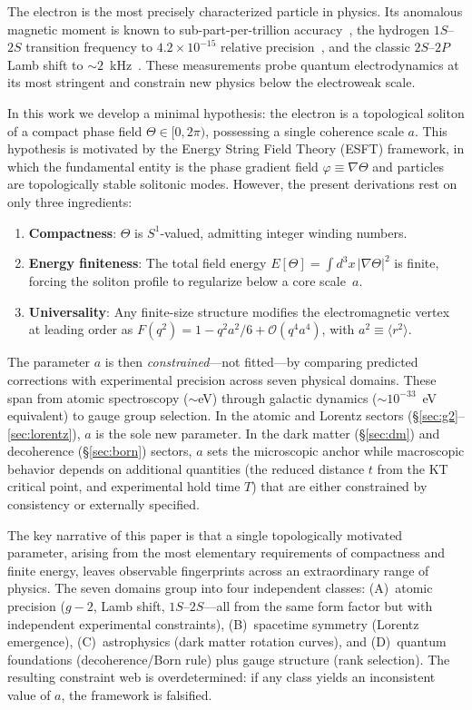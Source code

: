 ﻿\documentclass[a4paper,12pt]{article}
\newcommand{\vev}[1]{\langle #1 \rangle}
\newcommand{\order}[1]{\mathcal{O}(#1)}
\begin{document}
The electron is the most precisely characterized particle in physics.
Its anomalous magnetic moment is known to sub-part-per-trillion
accuracy~\cite{Fan2023,Morel2020}, the hydrogen $1S$--$2S$ transition
frequency to $4.2\times 10^{-15}$ relative precision~\cite{Parthey2011},
and the classic $2S$--$2P$ Lamb shift to $\sim 2$~kHz~\cite{Bezginov2019}.
These measurements probe quantum electrodynamics at its most stringent
and constrain new physics below the electroweak scale.

In this work we develop a minimal hypothesis: the electron is a
topological soliton of a compact phase field $\Theta\in[0,2\pi)$,
possessing a single coherence scale $a$.  This hypothesis is motivated
by the Energy String Field Theory (ESFT) framework, in
which the fundamental entity is the phase gradient field
$\varphi\equiv\nabla\Theta$ and particles are topologically stable
solitonic modes.  However, the present derivations rest on only three
ingredients:
\begin{enumerate}
  \item \textbf{Compactness}: $\Theta$ is $S^1$-valued, admitting
    integer winding numbers.
  \item \textbf{Energy finiteness}: The total field energy
    $E[\Theta]=\int d^3x\,|\nabla\Theta|^2$ is finite, forcing
    the soliton profile to regularize below a core scale~$a$.
  \item \textbf{Universality}: Any finite-size structure modifies the
    electromagnetic vertex at leading order as
    $F(q^2)=1-q^2a^2/6+\order{q^4a^4}$, with $a^2\equiv\vev{r^2}$.
\end{enumerate}

The parameter $a$ is then \emph{constrained}---not fitted---by comparing
predicted corrections with experimental precision across seven
physical domains.  These span from atomic spectroscopy
($\sim$eV) through galactic dynamics ($\sim 10^{-33}$~eV equivalent)
to gauge group selection.  In the atomic and Lorentz sectors (§\ref{sec:g2}--\ref{sec:lorentz}),
$a$ is the sole new parameter.  In the dark matter (§\ref{sec:dm})
and decoherence (§\ref{sec:born}) sectors, $a$ sets the microscopic
anchor while macroscopic behavior depends on additional
quantities (the reduced distance $t$ from the KT critical point,
and experimental hold time $T$) that are either constrained by
consistency or externally specified.

The key narrative of this paper is that a single topologically motivated
parameter, arising from the most elementary requirements of compactness
and finite energy, leaves observable fingerprints across an extraordinary
range of physics.  The seven domains group into four independent
classes: (A)~atomic precision ($g{-}2$, Lamb shift, $1S$--$2S$---all
from the same form factor but with independent experimental
constraints), (B)~spacetime symmetry (Lorentz emergence),
(C)~astrophysics (dark matter rotation curves), and (D)~quantum
foundations (decoherence/Born rule) plus gauge structure (rank
selection).  The resulting constraint web is overdetermined: if any
class yields an inconsistent value of $a$, the framework is falsified.
\end{document}
